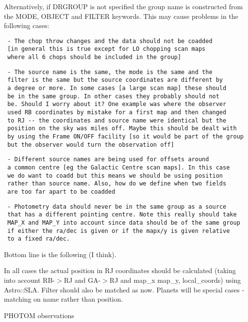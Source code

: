 \begin{description}
Alternatively, if DRGROUP is not specified the group name is
constructed from the MODE, OBJECT and FILTER keywords. This may cause
problems in the following cases:

\begin{verbatim}
 - The chop throw changes and the data should not be coadded
 [in general this is true except for LO chopping scan maps
 where all 6 chops should be included in the group]
\end{verbatim}
\begin{verbatim}
 - The source name is the same, the mode is the same and the
 filter is the same but the source coordinates are different by
 a degree or more. In some cases [a large scan map] these should
 be in the same group. In other cases they probably should not
 be. Should I worry about it? One example was where the observer
 used RB coordinates by mistake for a first map and then changed
 to RJ -- the coordinates and source name were identical but the
 position on the sky was miles off. Maybe this should be dealt with
 by using the Frame ON/OFF facility [so it would be part of the group
 but the observer would turn the observation off]
\end{verbatim}
\begin{verbatim}
 - Different source names are being used for offsets around
 a common centre [eg the Galactic Centre scan maps]. In this case
 we do want to coadd but this means we should be using position
 rather than source name. Also, how do we define when two fields
 are too far apart to be coadded
\end{verbatim}
\begin{verbatim}
 - Photometry data should never be in the same group as a source
 that has a different pointing centre. Note this really should take
 MAP_X and MAP_Y into account since data should be of the same group
 if either the ra/dec is given or if the mapx/y is given relative
 to a fixed ra/dec.
\end{verbatim}


Bottom line is the following (I think).



In all cases the actual position in RJ coordinates should be calculated
(taking into account RB-$>$RJ and GA-$>$RJ and map\_x map\_y, local\_coords) 
using Astro::SLA. Filter should also be matched as now.
Planets will be special cases - matching on name rather than position.



PHOTOM observations


\end{description}
